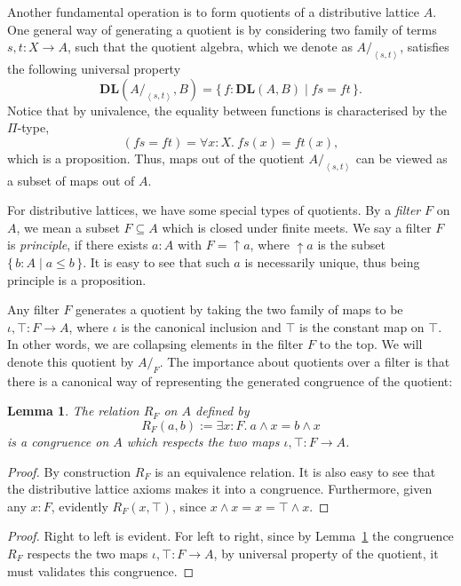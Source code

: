 \documentclass[12pt]{amsart}
\newtheorem{lemma}[theorem]{Lemma}
\newtheorem{proposition}[theorem]{Proposition}
\theoremstyle{definition}
\newcommand{\mb}[1]{\mathbf{#1}}
\newcommand{\DL}{\mb{DL}}
\newcommand{\eff}{\Leftrightarrow}
\newcommand{\pair}[1]{\left\langle#1\right\rangle}
\newcommand{\scomp}[2]{\{\,#1\mid#2\,\}}
\newcommand{\surj}{\twoheadrightarrow}
\newcommand{\dv}{\operatorname{\uparrow}}
\newcommand{\fa}[2]{\forall #1\!\colon\!\!#2.\ }
\newcommand{\ex}[2]{\exists #1\!\colon\!\!#2.\ }
\newcommand{\quot}[1]{/_{\pair{#1}}}
\begin{document}
Another fundamental operation is to form quotients of a distributive lattice $A$. One general way of generating a quotient is by considering two family of terms $s,t : X \to A$, such that the quotient algebra, which we denote as $A\quot{s,t}$, satisfies the following universal property
\[ \DL(A\quot{s,t},B) = \scomp{f : \DL(A,B)}{fs = ft}. \]
Notice that by univalence, the equality between functions is characterised by the $\Pi$-type,
\[ (fs = ft) = \fa xX fs(x) = ft(x), \]
which is a proposition. Thus, maps out of the quotient $A\quot{s,t}$ can be viewed as a subset of maps out of $A$.

For distributive lattices, we have some special types of quotients. By a \emph{filter} $F$ on $A$, we mean a subset $F \subseteq A$ which is closed under finite meets. We say a filter $F$ is \emph{principle}, if there exists $a : A$ with $F = \dv a$, where $\dv a$ is the subset $\scomp{b:A}{a \le b}$. It is easy to see that such $a$ is necessarily unique, thus being principle is a proposition.

Any filter $F$ generates a quotient by taking the two family of maps to be $\iota,\top : F \to A$, where $\iota$ is the canonical inclusion and $\top$ is the constant map on $\top$. In other words, we are collapsing elements in the filter $F$ to the top. We will denote this quotient by $A/_F$. The importance about quotients over a filter is that there is a canonical way of representing the generated congruence of the quotient:

\begin{lemma}\label{lem:filtercong}
  The relation $R_F$ on $A$ defined by
  \[ R_F(a,b) := \ex xF a \wedge x = b \wedge x \]
  is a congruence on $A$ which respects the two maps $\iota,\top : F \to A$.
\end{lemma}
\begin{proof}
  By construction $R_F$ is an equivalence relation. It is also easy to see that the distributive lattice axioms makes it into a congruence. Furthermore, given any $x:F$, evidently $R_F(x,\top)$, since $x \wedge x = x = \top \wedge x$.
\end{proof}

\begin{proof}
  Right to left is evident. For left to right, since by Lemma~\ref{lem:filtercong} the congruence $R_F$ respects the two maps $\iota,\top : F \to A$, by universal property of the quotient, it must validates this congruence. 
\end{proof}
\end{document}
